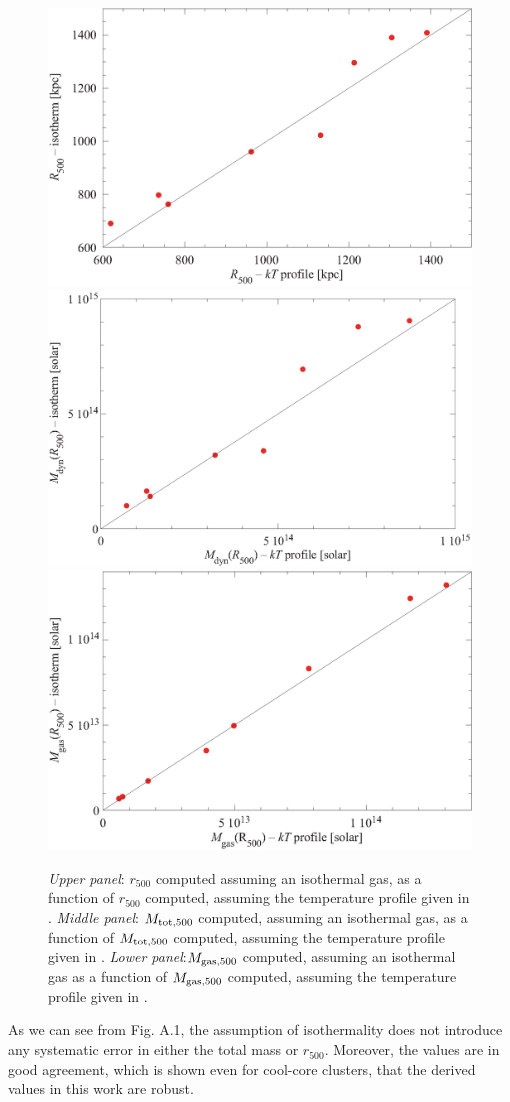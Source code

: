 \documentclass{aa}
\begin{document}
\begin{appendix}
\begin{figure}[ht!]
\centering
\includegraphics[width=9.cm]{r500_profile_isother.eps}
\includegraphics[width=9.cm]{Mdyn_kTprofile_Isotherm.eps}
\includegraphics[width=9.cm]{Mgas_kTprofile_Isotherm.eps}
\caption{\textit{Upper panel}: $r_{500}$ computed assuming an isothermal gas, 
as a function of $r_{500}$ computed, assuming the temperature profile given in \citet{V06}.
\textit{Middle panel}: $M_{\rm tot, 500}$ computed, assuming an isothermal gas, 
as a function of $M_{\rm tot, 500}$ computed, assuming the temperature profile given in \citet{V06}.
\textit{Lower panel}:$M_{\rm gas, 500}$ computed, assuming an isothermal gas as a function 
of $M_{\rm gas, 500}$ computed, assuming the temperature profile given in \citet{V06}.} 
\label{fig:isotherm}
\end{figure}


As we can see from Fig. A.1, the assumption of isothermality does not
introduce any systematic error in either the total mass or  $r_{500}$. Moreover,
the values are in good agreement, which is shown even for cool-core clusters, that the derived
values in this work are robust.


\end{appendix}
\end{document}
